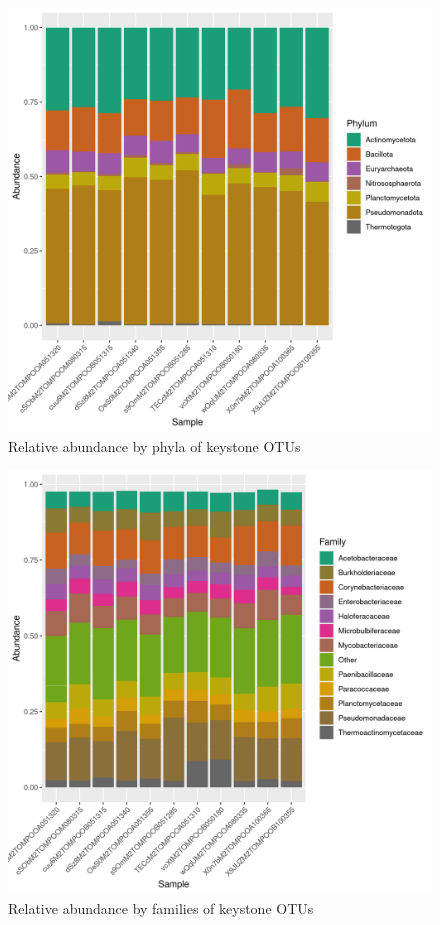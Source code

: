 \begin{figure}
\centering
\includegraphics[scale = 0.8]{tomate_aleatorio1_8.csv_relative_abundance_Phylum.png}
\caption{Relative abundance by phyla of keystone OTUs }
\label{fig:tomate_aleatorio1_8.csv_phyla}
\end{figure}
\begin{figure}
\centering
\includegraphics[scale = 0.8]{tomate_aleatorio1_8.csv_relative_abundance_Family.png}
\caption{Relative abundance by families of keystone OTUs }
\label{fig:tomate_aleatorio1_8.csv_family}
\end{figure}
